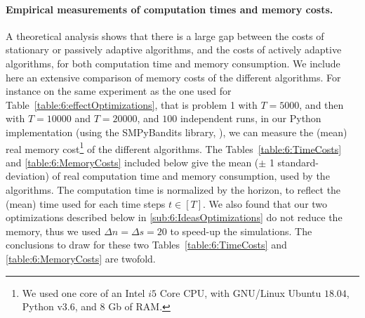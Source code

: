 

\paragraph{Empirical measurements of computation times and memory costs.}
%
A theoretical analysis shows that there is a large gap between the costs of stationary or passively adaptive algorithms,
and the costs of actively adaptive algorithms, for both computation time and memory consumption.
%
We include here an extensive comparison of memory costs of the different algorithms.
%
For instance on the same experiment as the one used for Table~\ref{table:6:effectOptimizations}, that is problem 1 with $T=5000$, and then with $T=10000$ and $T=20000$, and $100$ independent runs,
in our Python implementation (using the SMPyBandits library, \cite{SMPyBandits}), we can measure the (mean) real memory cost\footnote{We used one core of an Intel $i5$ Core CPU, with GNU/Linux Ubuntu $18.04$, Python v$3.6$, and $8$ Gb of RAM.} of the different algorithms.
The Tables~\ref{table:6:TimeCosts} and \ref{table:6:MemoryCosts} included below give the mean ($\pm$ 1 standard-deviation) of real computation time and memory consumption, used by the algorithms.
The computation time is normalized by the horizon, to reflect the (mean) time used for each time steps $t\in[T]$.
%
We also found that our two optimizations described below in \ref{sub:6:IdeasOptimizations} do not reduce the memory, thus we used $\Delta n = \Delta s = 20$ to speed-up the simulations.
%
The conclusions to draw for these two Tables~\ref{table:6:TimeCosts} and \ref{table:6:MemoryCosts} are twofold.


